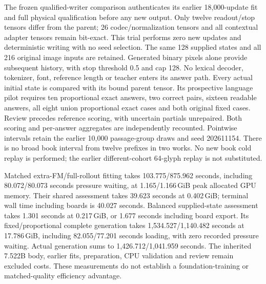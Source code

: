 The frozen qualified-writer comparison authenticates its earlier 18,000-update
fit and full physical qualification before any new output. Only twelve
readout/stop tensors differ from the parent; 26 codec/normalization tensors
and all contextual adapter tensors remain bit-exact. This trial performs
zero new updates and deterministic writing with no seed selection. The same
128 supplied states and all 216 original image inputs are retained. Generated
binary pixels alone provide subsequent history, with stop threshold 0.5 and
cap 128. No lexical decoder, tokenizer, font, reference length or teacher
enters its answer path. Every actual initial state is compared with its
bound parent tensor. Its prospective language pilot requires ten proportional
exact answers, two correct pairs, sixteen readable answers, all eight union
proportional exact cases and both original fixed cases. Review precedes
reference scoring, with uncertain partials unrepaired. Both scoring and
per-answer aggregates are independently recounted. Pointwise intervals retain
the earlier 10,000 passage-group draws and seed 202611154. There is no broad
book interval from twelve prefixes in two works. No new book cold replay is
performed; the earlier different-cohort 64-glyph replay is not substituted.

Matched extra-FM/full-rollout fitting takes 103.775/875.962 seconds, including
80.072/80.073 seconds pressure waiting, at 1.165/1.166\,GiB peak allocated GPU
memory. Their shared assessment takes 39.623 seconds at 0.402\,GiB; terminal
wall time including boards is 40.027 seconds. Balanced supplied-state
assessment takes 1.301 seconds at 0.217\,GiB, or 1.677 seconds including board
export. Its fixed/proportional complete generation takes
1,534.527/1,140.482 seconds at 17.786\,GiB, including 82.055/77.201 seconds
loading, with zero recorded pressure waiting. Actual generation sums to
1,426.712/1,041.959 seconds. The inherited 7.522B body, earlier fits, preparation,
CPU validation and review remain excluded costs. These measurements do not
establish a foundation-training or matched-quality efficiency advantage.
